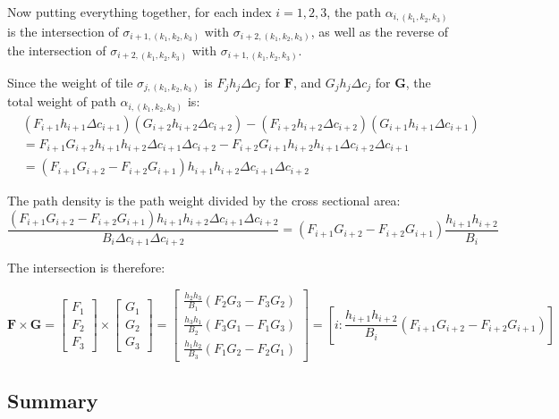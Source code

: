 Now putting everything together, for each index \(i = 1, 2, 3\), the path \(\alpha_{i, (k_1, k_2, k_3)}\) is the intersection of \(\sigma_{i+1, (k_1, k_2, k_3)}\) with \(\sigma_{i+2, (k_1, k_2, k_3)}\), as well as the reverse of the intersection of \(\sigma_{i+2, (k_1, k_2, k_3)}\) with \(\sigma_{i+1, (k_1, k_2, k_3)}\).

Since the weight of tile \(\sigma_{j, (k_1, k_2, k_3)}\) is \(F_j h_j \Delta c_j\) for \(\mathbf{F}\), and \(G_j h_j \Delta c_j\) for \(\mathbf{G}\), the total weight of path \(\alpha_{i, (k_1,k_2,k_3)}\) is: 
\begin{align*}
& (F_{i+1} h_{i+1} \Delta c_{i+1})(G_{i+2} h_{i+2} \Delta c_{i+2}) - (F_{i+2} h_{i+2} \Delta c_{i+2})(G_{i+1} h_{i+1} \Delta c_{i+1}) \\
& = F_{i+1} G_{i+2} h_{i+1} h_{i+2} \Delta c_{i+1} \Delta c_{i+2} - F_{i+2} G_{i+1} h_{i+2} h_{i+1} \Delta c_{i+2} \Delta c_{i+1} \\
& = (F_{i+1} G_{i+2} - F_{i+2} G_{i+1})h_{i+1} h_{i+2} \Delta c_{i+1} \Delta c_{i+2}
\end{align*}

The path density is the path weight divided by the cross sectional area:
\[\frac{(F_{i+1} G_{i+2} - F_{i+2} G_{i+1})h_{i+1} h_{i+2} \Delta c_{i+1} \Delta c_{i+2}}{B_i \Delta c_{i+1} \Delta c_{i+2}} = (F_{i+1} G_{i+2} - F_{i+2} G_{i+1})\frac{h_{i+1} h_{i+2}}{B_i}\]

The intersection is therefore:

\begin{thm}
\[\mathbf{F} \times \mathbf{G} = \begin{bmatrix} F_1 \\ F_2 \\ F_3 \end{bmatrix} \times \begin{bmatrix} G_1 \\ G_2 \\ G_3 \end{bmatrix}
 = \begin{bmatrix} \frac{h_2 h_3}{B_1}(F_2 G_3 - F_3 G_2) \\ \frac{h_3 h_1}{B_2}(F_3 G_1 - F_1 G_3) \\ \frac{h_1 h_2}{B_3}(F_1 G_2 - F_2 G_1) \end{bmatrix}
 = \left[i : \frac{h_{i+1} h_{i+2}}{B_i} (F_{i+1} G_{i+2} - F_{i+2} G_{i+1})\right]\]
\end{thm}



\subsection*{Summary}

